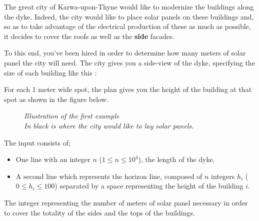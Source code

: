 \problemname{\problemyamlname}

The great city of Karwa-upon-Thyne would like to modernize the buildings along the dyke.
Indeed, the city would like to place solar panels on these buildings and, so as to take advantage of the electrical production of these as much as possible, it decides to cover the roofs as well as the \textbf{side} facades.

To this end, you've been hired in order to determine how many meters of solar panel the city will need.
The city gives you a side-view of the dyke, specifying the size of each building like this :

For each 1 meter wide spot, the plan gives you the height of the building at that spot as shown in the figure below.

\begin{figure}[h]
\centering
{}
\newline
\textit{Illustration of the first example \\ In black is where the city would like to lay solar panels.}
\end{figure}

\begin{Input}
	The input consists of;
	\begin{itemize}
		\item One line with an integer $n$ ($1 \le n \le 10^4$), the length of the dyke.
		\item A second line which represents the horizon line, composed of $n$ integers $h_i$ ($0 \le h_i \le 100$) separated by a space representing the height of the building $i$.
	\end{itemize}
\end{Input}

\begin{Output}
	The integer representing the number of meters of solar panel necessary in order to cover the totality of the sides and the tops of the buildings.
\end{Output}

